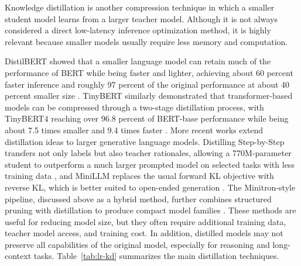 \documentclass[
11pt, %
english, %
singlespacing, %
headsepline, %
]{MastersDoctoralThesis} %
\begin{document}
Knowledge distillation is another compression technique in which a smaller student model learns from a larger teacher model. Although it is not always considered a direct low-latency inference optimization method, it is highly relevant because smaller models usually require less memory and computation.

DistilBERT showed that a smaller language model can retain much of the performance of BERT while being faster and lighter, achieving about 60 percent faster inference and roughly 97 percent of the original performance at about 40 percent smaller size \cite{sanh2020distilbert}. TinyBERT similarly demonstrated that transformer-based models can be compressed through a two-stage distillation process, with TinyBERT4 reaching over 96.8 percent of BERT-base performance while being about 7.5 times smaller and 9.4 times faster \cite{jiao2020tinybert}. More recent works extend distillation ideas to larger generative language models. Distilling Step-by-Step transfers not only labels but also teacher rationales, allowing a 770M-parameter student to outperform a much larger prompted model on selected tasks with less training data \cite{hsieh2023distilling}, and MiniLLM replaces the usual forward KL objective with reverse KL, which is better suited to open-ended generation \cite{gu2024minillm}. The Minitron-style pipeline, discussed above as a hybrid method, further combines structured pruning with distillation to produce compact model families \cite{muralidharan2024minitron}. These methods are useful for reducing model size, but they often require additional training data, teacher model access, and training cost. In addition, distilled models may not preserve all capabilities of the original model, especially for reasoning and long-context tasks. Table~\ref{tab:lr-kd} summarizes the main distillation techniques.
\end{document}

